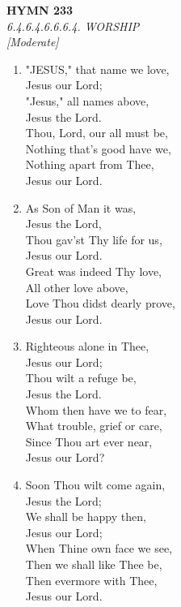 \documentclass[11pt,a4paper]{article}
\begin{document}
\newpage
\begin{center}
    {\Large \textbf{HYMN 233}}
    \\
    \textit{6.4.6.4.6.6.6.4. WORSHIP}
    \\
    \textit{\small [Moderate]}
\end{center}
\vspace{1em}

\begin{enumerate}
    \item "JESUS," that name we love, \\
            Jesus our Lord; \\
        "Jesus," all names above, \\
            Jesus the Lord. \\
        Thou, Lord, our all must be, \\
        Nothing that's good have we, \\
        Nothing apart from Thee, \\
            Jesus our Lord.

    \item As Son of Man it was, \\
            Jesus the Lord, \\
        Thou gav'st Thy life for us, \\
            Jesus our Lord. \\
        Great was indeed Thy love, \\
        All other love above, \\
        Love Thou didst dearly prove, \\
            Jesus our Lord.

    \item Righteous alone in Thee, \\
            Jesus our Lord; \\
        Thou wilt a refuge be, \\
            Jesus the Lord. \\
        Whom then have we to fear, \\
        What trouble, grief or care, \\
        Since Thou art ever near, \\
            Jesus our Lord?

    \item Soon Thou wilt come again, \\
            Jesus the Lord; \\
        We shall be happy then, \\
            Jesus our Lord; \\
        When Thine own face we see, \\
        Then we shall like Thee be, \\
        Then evermore with Thee, \\
            Jesus our Lord.

\end{enumerate}
\end{document}

